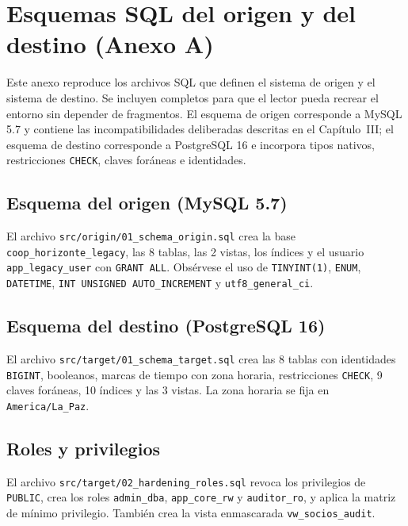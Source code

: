 
\section{Esquemas SQL del origen y del destino (Anexo A)}

Este anexo reproduce los archivos SQL que definen el sistema de origen y el
sistema de destino. Se incluyen completos para que el lector pueda recrear el
entorno sin depender de fragmentos. El esquema de origen corresponde a MySQL
5.7 y contiene las incompatibilidades deliberadas descritas en el
Capítulo~III; el esquema de destino corresponde a PostgreSQL 16 e incorpora
tipos nativos, restricciones \texttt{CHECK}, claves foráneas e identidades.

\subsection{Esquema del origen (MySQL 5.7)}

El archivo \texttt{src/origin/01\_schema\_origin.sql} crea la base
\texttt{coop\_horizonte\_legacy}, las 8 tablas, las 2 vistas, los índices y el
usuario \texttt{app\_legacy\_user} con \texttt{GRANT ALL}. Obsérvese el uso de
\texttt{TINYINT(1)}, \texttt{ENUM}, \texttt{DATETIME}, \texttt{INT UNSIGNED
AUTO\_INCREMENT} y \texttt{utf8\_general\_ci}.



\subsection{Esquema del destino (PostgreSQL 16)}

El archivo \texttt{src/target/01\_schema\_target.sql} crea las 8 tablas con
identidades \texttt{BIGINT}, booleanos, marcas de tiempo con zona horaria,
restricciones \texttt{CHECK}, 9 claves foráneas, 10 índices y las 3 vistas. La
zona horaria se fija en \texttt{America/La\_Paz}.



\subsection{Roles y privilegios}

El archivo \texttt{src/target/02\_hardening\_roles.sql} revoca los privilegios
de \texttt{PUBLIC}, crea los roles \texttt{admin\_dba}, \texttt{app\_core\_rw}
y \texttt{auditor\_ro}, y aplica la matriz de mínimo privilegio. También crea
la vista enmascarada \texttt{vw\_socios\_audit}.


